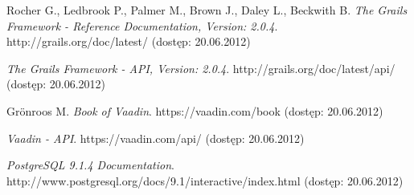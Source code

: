 \begin{thebibliography}{99}

  Rocher G., Ledbrook P., Palmer M., Brown J., Daley L., Beckwith B.
  \emph{The Grails Framework - Reference Documentation, 
  Version: 2.0.4}.
  http://grails.org/doc/latest/
  \newblock (dostęp: 20.06.2012)

  \emph{The Grails Framework - API, 
  Version: 2.0.4}.
  http://grails.org/doc/latest/api/
  \newblock (dostęp: 20.06.2012)

  Grönroos M.
  \emph{Book of Vaadin}.
  https://vaadin.com/book
  \newblock (dostęp: 20.06.2012)

  \emph{Vaadin - API}.
  https://vaadin.com/api/
  \newblock (dostęp: 20.06.2012)

  \emph{PostgreSQL 9.1.4 Documentation}.
  http://www.postgresql.org/docs/9.1/interactive/index.html
  \newblock (dostęp: 20.06.2012)

\end{thebibliography}
